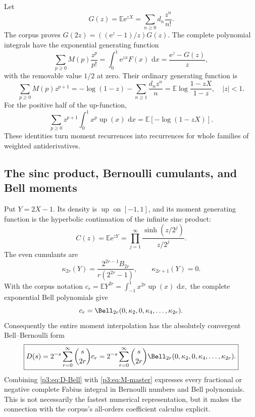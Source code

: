 \documentclass[11pt,oneside]{article}
\theoremstyle{definition}
\theoremstyle{remark}
\newcommand{\Up}{\operatorname{up}}
\newcommand{\E}{\mathbb E}
\newcommand{\dd}{\,\mathrm d}
\newcommand{\e}{\mathrm e}
\newcommand{\1}{\mathbf 1}
\begin{document}
Let
\begin{equation}
 G(z)=\E\e^{zX}=\sum_{n\ge0}d_n\frac{z^n}{n!}.                \label{p3:eq:G}
\end{equation}
The corpus proves $G(2z)=((\e^z-1)/z)G(z)$.  The complete polynomial integrals have the
exponential generating function
\begin{equation}
 \boxed{
 \sum_{p\ge0}M(p)\frac{z^p}{p!}
 =\int_0^1\e^{zx}F(x)\,\dd x
 =\frac{\e^z-G(z)}{z},}
 \label{p3:eq:M-egf}
\end{equation}
with the removable value $1/2$ at zero.  Their ordinary generating function is
\begin{equation}
 \boxed{
 \sum_{p\ge0}M(p)z^{p+1}
 =-\log(1-z)-\sum_{n\ge1}\frac{d_nz^n}{n}
 =\E\log\frac{1-zX}{1-z},\quad |z|<1.}
 \label{p3:eq:M-ogf}
\end{equation}
For the positive half of the up-function,
\begin{equation}
 \sum_{p\ge0}z^{p+1}\int_0^1x^p\Up(x)\,\dd x
 =\E[-\log(1-zX)].                                          \label{p3:eq:up-ogf}
\end{equation}
These identities turn moment recurrences into recurrences for whole families of weighted
antiderivatives.

\subsection{The sinc product, Bernoulli cumulants, and Bell moments}

Put $Y=2X-1$.  Its density is $\Up$ on $[-1,1]$, and its moment generating function is the
hyperbolic continuation of the infinite sinc product:
\begin{equation}
 C(z)=\E\e^{zY}
 =\prod_{j=1}^{\infty}\frac{\sinh(z/2^j)}{z/2^j}.             \label{p3:eq:C-product}
\end{equation}
The even cumulants are
\begin{equation}
 \kappa_{2r}(Y)=\frac{2^{2r-1}B_{2r}}{r(2^{2r}-1)},
 \qquad \kappa_{2r+1}(Y)=0.                                  \label{p3:eq:Y-cumulants}
\end{equation}
With the corpus notation
\(
 c_r=\E Y^{2r}=\int_{-1}^{1}x^{2r}\Up(x)\,\dd x,
\)
the complete exponential Bell polynomials give
\begin{equation}
 c_r=\Bell_{2r}(0,\kappa_2,0,\kappa_4,\ldots,\kappa_{2r}).    \label{p3:eq:Bell-moments}
\end{equation}
Consequently the entire moment interpolation has the absolutely convergent Bell--Bernoulli
form
\begin{equation}
 \boxed{
 D(s)=2^{-s}\sum_{r=0}^{\infty}\binom{s}{2r}c_r
 =2^{-s}\sum_{r=0}^{\infty}\binom{s}{2r}
 \Bell_{2r}(0,\kappa_2,0,\kappa_4,\ldots,\kappa_{2r}).}
 \label{p3:eq:D-Bell}
\end{equation}
Combining \eqref{p3:eq:D-Bell} with \eqref{p3:eq:M-master} expresses every fractional or negative
complete Fabius integral in Bernoulli numbers and Bell polynomials.  This is not necessarily
the fastest numerical representation, but it makes the connection with the corpus's
all-orders coefficient calculus explicit.
\end{document}
